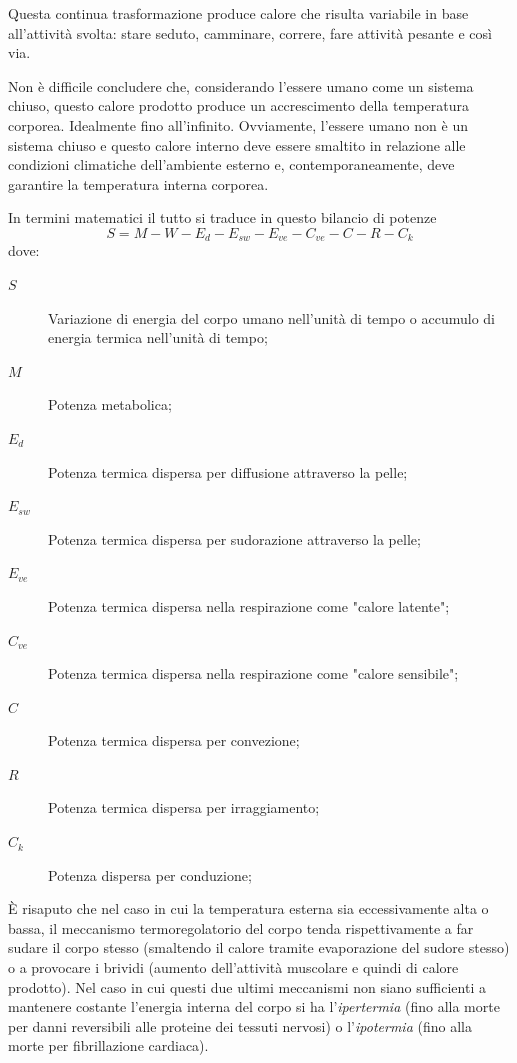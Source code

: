 Questa continua trasformazione produce calore che risulta variabile in base all'attività svolta: stare seduto, camminare, correre, fare attività pesante e così via.

Non è difficile concludere che, considerando l'essere umano come un sistema chiuso, questo calore prodotto produce un accrescimento della temperatura corporea. Idealmente fino all'infinito. Ovviamente, l'essere umano non è un sistema chiuso e questo calore interno deve essere smaltito in relazione alle condizioni climatiche dell'ambiente esterno e, contemporaneamente, deve garantire la temperatura interna corporea.

In termini matematici il tutto si traduce in questo bilancio di potenze
\begin{equation}
	\label{bilanciocorpoumano}
	S=M-W-E_d-E_{sw}-E_{ve}-C_{ve}-C-R-C_k
\end{equation}
dove:
\begin{description}
	\item[$S$]Variazione di energia del corpo umano nell'unità di tempo o accumulo di energia termica nell'unità di tempo;
	\item[$M$]Potenza metabolica;
	\item[$E_d$] Potenza termica dispersa per diffusione attraverso la pelle;
	\item[$E_{sw}$] Potenza termica dispersa per sudorazione attraverso la pelle;
	\item[$E_{ve}$] Potenza termica dispersa nella respirazione come "calore latente";
	\item[$C_{ve}$] Potenza termica dispersa nella respirazione come "calore sensibile";
	\item[$C$] Potenza termica dispersa per convezione;
	\item[$R$] Potenza termica dispersa per irraggiamento;
	\item[$C_k$] Potenza dispersa per conduzione;
\end{description}
È risaputo che nel caso in cui la temperatura esterna sia eccessivamente alta o bassa, il meccanismo termoregolatorio del corpo tenda rispettivamente a far sudare il corpo stesso (smaltendo il calore tramite evaporazione del sudore stesso) o a provocare i brividi (aumento dell'attività muscolare e quindi di calore prodotto). Nel caso in cui questi due ultimi meccanismi non siano sufficienti a mantenere costante l'energia interna del corpo si ha l'\emph{ipertermia} (fino alla morte per danni reversibili alle proteine dei tessuti nervosi) o l'\emph{ipotermia} (fino alla morte per fibrillazione cardiaca).

